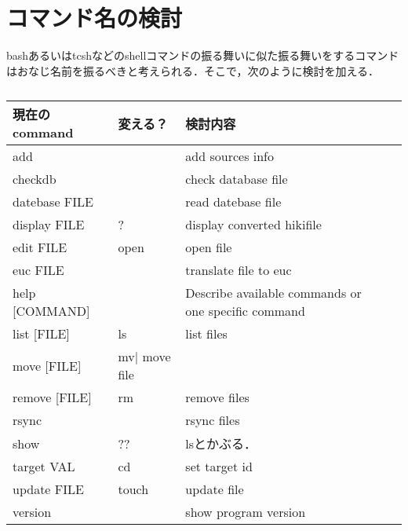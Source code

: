 \section{コマンド名の検討}
bashあるいはtcshなどのshellコマンドの振る舞いに似た振る舞いをするコマンドはおなじ名前を振るべきと考えられる．そこで，次のように検討を加える．

\begin{table}[htbp]\begin{center}
\caption{}
\begin{tabular}{llll}
\hline
現在のcommand  &変える？  &検討内容  \\ \hline
add               &  &add sources info  \\
checkdb           &  &check database file  \\
datebase FILE     &  &read datebase file  \\
display FILE      &?  &display converted hikifile  \\
edit FILE         &open  &open file  \\
euc FILE          &  &translate file to euc  \\
help [COMMAND]    &  &Describe available commands or one specific command  \\
list [FILE]       &ls  &list files  \\
move [FILE]       &mv|  move file  \\
remove [FILE]     &rm  &remove files  \\
rsync             &  &rsync files  \\
show              &??  &lsとかぶる．  \\
target VAL        &cd  &set target id  \\
update FILE       &touch  &update file  \\
version           &  &show program version  \\
\hline
\end{tabular}
\label{default}
\end{center}\end{table}

